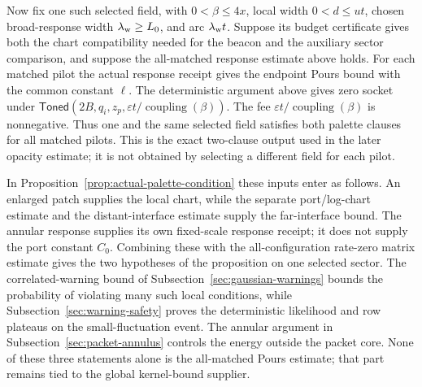 Now fix one such selected field, with $0<\beta\leq4x$, local
width $0<d\leq u t$, chosen broad-response width $\lambda_{\rm w}\geq L_0$,
and arc $\lambda_{\rm w} t$. Suppose its budget certificate gives
both the chart compatibility needed for the beacon and the auxiliary
sector comparison, and suppose the all-matched response estimate above
holds. For each matched pilot the actual response receipt gives the
endpoint Pours bound with the common constant $\ell$. The deterministic
argument above gives zero socket under
$\mathsf{Toned}(2B,q_i,z_p,\varepsilon t/\operatorname{coupling}(\beta))$.
The fee $\varepsilon t/\operatorname{coupling}(\beta)$ is nonnegative.
Thus one and the same selected field satisfies both palette clauses for
all matched pilots. This is the exact two-clause output used in the later
opacity estimate; it is not obtained by selecting a different field for
each pilot.

In Proposition~\ref{prop:actual-palette-condition} these inputs enter as
follows. An enlarged patch supplies the local chart, while the separate
port/log-chart estimate and the distant-interface estimate supply the far-interface
bound. The annular response supplies its own fixed-scale response receipt;
it does not supply the port constant $C_0$.
Combining these with the all-configuration rate-zero matrix estimate gives
the two hypotheses of the proposition on one selected sector. The
correlated-warning bound of Subsection~\ref{sec:gaussian-warnings} bounds the
probability of violating many such local conditions, while
Subsection~\ref{sec:warning-safety} proves the deterministic likelihood and
row plateaus on the small-fluctuation event. The annular argument in
Subsection~\ref{sec:packet-annulus} controls the energy outside the packet
core. None of these three statements alone is the all-matched Pours
estimate; that part remains tied to the global kernel-bound supplier.
